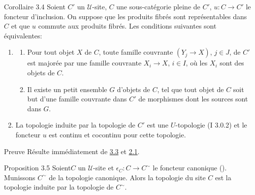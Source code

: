 \documentclass[10pt]{../fichiers-configuration-latex/smfart}
\begin{document}
\begin{enonce*}{Corollaire 3.4}
Soient $C'$ un $𝒰$-site, $C$ une sous-catégorie pleine
de $C'$, $u:C\rightarrow C'$ le foncteur d'inclusion. On suppose que
les produits fibrés sont représentables dans $C$ et que $u$
commute aux produits fibrés. Les conditions suivantes sont
équivalentes:
\begin{enumerate}
\renewcommand{\theenumi}{\roman{enumi}}
\renewcommand{\labelenumi}{\theenumi)}
\item
\begin{enumerate}
\renewcommand{\theenumii}{\alph{enumii}}
\renewcommand{\labelenumii}{\theenumii)}
\item Pour tout objet $X$ de $C$, toute famille couvrante
  $(Y_j\rightarrow X)$, $j\in J$, de $C'$ est majorée par une
  famille couvrante $X_i\rightarrow X$, $i\in I$, où les $X_i$ sont
  des objets de $C$.

\item Il existe un petit ensemble $G$ d'objets de $C$, tel que tout
  objet de $C$ soit but d'une famille couvrante dans $C'$ de
  morphismes dont les sources sont dans $G$.
\end{enumerate}

\item La topologie induite par la topologie de $C'$ est une
  $U$-topologie {\rm (I 3.0.2)} et le foncteur $u$ est continu et
  cocontinu pour cette topologie.
\end{enumerate}
\end{enonce*}

\begin{enonce*}[remark]{Preuve}
Résulte immédiatement de \hyperref[III.cor3.3]{3.3} et \hyperref[III.def2.1]{2.1}.
\end{enonce*}

\begin{enonce*}{Proposition 3.5}
Soient\pageoriginale $C$ un $𝒰$-site et
$\epsilon_C:C\rightarrow C^{\sim}$ le foncteur canonique {\rm
()}. Munissons $C^{\sim}$ de la topologie
canonique. Alors la topologie du site $C$ est la topologie induite
par la topologie de $C^{\sim}$.
\end{enonce*}
\end{document}
